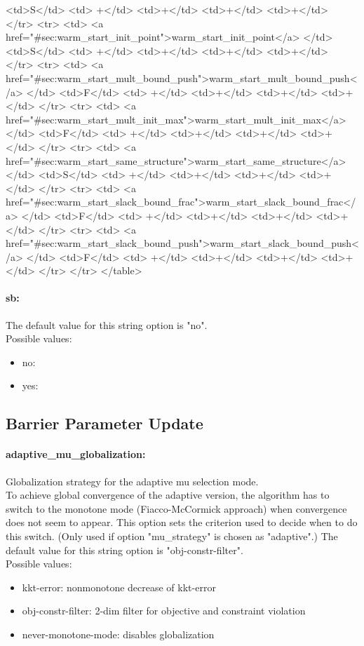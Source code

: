 {{<td>S</td>
<td> +</td>
<td>+</td>
<td>+</td>
<td>+</td>
</tr>
<tr>
<td> <a href="#sec:warm_start_init_point">warm_start_init_point</a> </td>
<td>S</td>
<td> +</td>
<td>+</td>
<td>+</td>
<td>+</td>
</tr>
<tr>
<td> <a href="#sec:warm_start_mult_bound_push">warm_start_mult_bound_push</a> </td>
<td>F</td>
<td> +</td>
<td>+</td>
<td>+</td>
<td>+</td>
</tr>
<tr>
<td> <a href="#sec:warm_start_mult_init_max">warm_start_mult_init_max</a> </td>
<td>F</td>
<td> +</td>
<td>+</td>
<td>+</td>
<td>+</td>
</tr>
<tr>
<td> <a href="#sec:warm_start_same_structure">warm_start_same_structure</a> </td>
<td>S</td>
<td> +</td>
<td>+</td>
<td>+</td>
<td>+</td>
</tr>
<tr>
<td> <a href="#sec:warm_start_slack_bound_frac">warm_start_slack_bound_frac</a> </td>
<td>F</td>
<td> +</td>
<td>+</td>
<td>+</td>
<td>+</td>
</tr>
<tr>
<td> <a href="#sec:warm_start_slack_bound_push">warm_start_slack_bound_push</a> </td>
<td>F</td>
<td> +</td>
<td>+</td>
<td>+</td>
<td>+</td>
</tr>
</tr>
</table>
}
}
\paragraph{sb:}\label{sec:sb}  $\;$ \\

The default value for this string option is "no".
\\ 
Possible values:
\begin{itemize}
   \item no: 
   \item yes: 
\end{itemize}

\subsection{Barrier Parameter Update}
\label{sec:Barrier_Parameter_Update}
\paragraph{adaptive\_mu\_globalization:}\label{sec:adaptive_mu_globalization} Globalization strategy for the adaptive mu selection mode. $\;$ \\
 To achieve global convergence of the adaptive
version, the algorithm has to switch to the
monotone mode (Fiacco-McCormick approach) when
convergence does not seem to appear.  This option
sets the criterion used to decide when to do this
switch. (Only used if option "mu\_strategy" is
chosen as "adaptive".)
The default value for this string option is "obj-constr-filter".
\\ 
Possible values:
\begin{itemize}
   \item kkt-error: nonmonotone decrease of kkt-error
   \item obj-constr-filter: 2-dim filter for objective and constraint
violation
   \item never-monotone-mode: disables globalization
\end{itemize}

